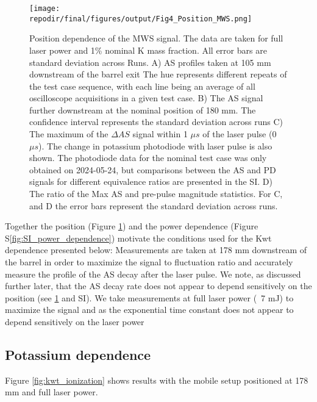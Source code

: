 \begin{figure}[h]
    \texttt{[image: \\repodir/final/figures/output/Fig4\_Position\_MWS.png]} 
    \centering
    \caption{Position dependence of the MWS signal. The data are taken for full laser power and 1\% nominal K mass fraction. All error bars are standard deviation across Runs. A) AS profiles taken at 105 mm downstream of the barrel exit The hue represents different repeats of the test case sequence, with each line being an average of all oscilloscope acquisitions in a given test case.  B) The AS signal further downstream at the nominal position of 180 mm. The confidence interval represents the standard deviation across runs C)  The maximum of the $\Delta AS$ signal within 1 $\mu s$ of the laser pulse (0 $\mu s$). The change in potassium photodiode with laser pulse is also shown. The photodiode data for the nominal test case was only obtained on 2024-05-24, but comparisons between the AS and PD signals for different equivalence ratios are presented in the SI. D) The ratio of the Max AS and pre-pulse magnitude statistics. For C, and D the error bars represent the standard deviation across runs. } 
    \label{fig:pos_dependence_mws}
\end{figure}





Together the position (Figure \ref{fig:pos_dependence_mws}) and the power dependence (Figure S\ref*{fig:SI_power_dependence}) motivate the conditions used for the Kwt dependence presented below: Measurements are taken at 178 mm downstream of the barrel in order to maximize the signal to fluctuation ratio and accurately measure the profile of the AS decay after the laser pulse. We note, as discussed further later, that the AS decay rate does not appear to depend sensitively on the position (see \ref{fig:pos_dependence_mws} and SI). We take measurements at full laser power (~7 mJ) to maximize the signal and as the exponential time constant does not appear to depend sensitively on the laser power

\clearpage

\subsection{Potassium dependence}

Figure \ref{fig:kwt_ionization} shows results with the mobile setup positioned at 178 mm and full laser power. 


